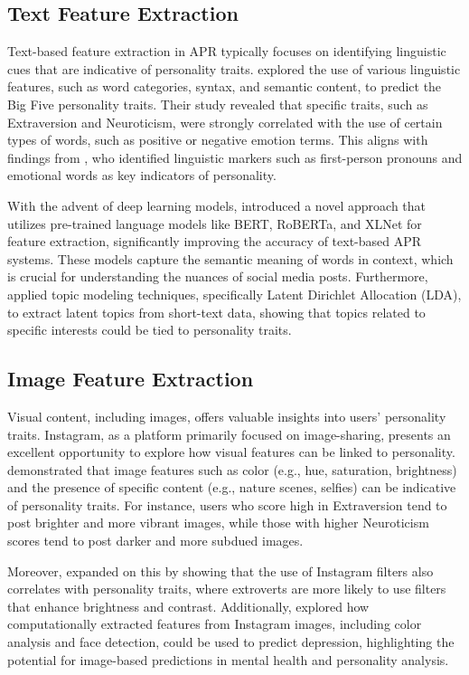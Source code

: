 \subsection{Text Feature Extraction}

Text-based feature extraction in APR typically focuses on identifying linguistic cues that are indicative of personality traits. \citet{Mairesse2007} explored the use of various linguistic features, such as word categories, syntax, and semantic content, to predict the Big Five personality traits. Their study revealed that specific traits, such as Extraversion and Neuroticism, were strongly correlated with the use of certain types of words, such as positive or negative emotion terms. This aligns with findings from \citet{Pennebaker1999}, who identified linguistic markers such as first-person pronouns and emotional words as key indicators of personality.

With the advent of deep learning models, \citet{Christian2021} introduced a novel approach that utilizes pre-trained language models like BERT, RoBERTa, and XLNet for feature extraction, significantly improving the accuracy of text-based APR systems. These models capture the semantic meaning of words in context, which is crucial for understanding the nuances of social media posts. Furthermore, \citet{Albalawi2020} applied topic modeling techniques, specifically Latent Dirichlet Allocation (LDA), to extract latent topics from short-text data, showing that topics related to specific interests could be tied to personality traits.

\subsection{Image Feature Extraction}

Visual content, including images, offers valuable insights into users' personality traits. Instagram, as a platform primarily focused on image-sharing, presents an excellent opportunity to explore how visual features can be linked to personality. \citet{Ferwerda2018} demonstrated that image features such as color (e.g., hue, saturation, brightness) and the presence of specific content (e.g., nature scenes, selfies) can be indicative of personality traits. For instance, users who score high in Extraversion tend to post brighter and more vibrant images, while those with higher Neuroticism scores tend to post darker and more subdued images.

Moreover, \citet{Branz2020} expanded on this by showing that the use of Instagram filters also correlates with personality traits, where extroverts are more likely to use filters that enhance brightness and contrast. Additionally, \citet{Reece2017} explored how computationally extracted features from Instagram images, including color analysis and face detection, could be used to predict depression, highlighting the potential for image-based predictions in mental health and personality analysis.

